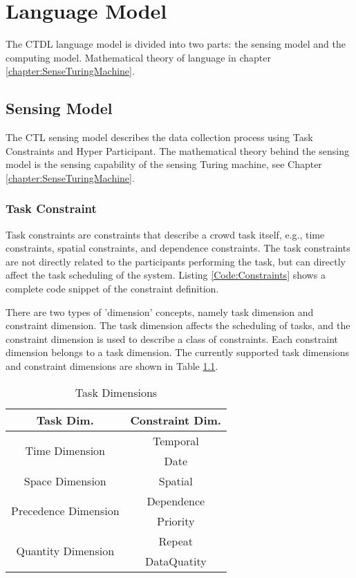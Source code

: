 \chapter{Language Model}
The CTDL language model is divided into two parts: the sensing model and the computing model. Mathematical theory of language in chapter \ref{chapter:SenseTuringMachine}.
\section{Sensing Model}
The CTL sensing model describes the data collection process using Task Constraints and Hyper Participant. The mathematical theory behind the sensing model is the sensing capability of the sensing Turing machine, see Chapter \ref{chapter:SenseTuringMachine}.

\subsection{Task Constraint}
Task constraints are constraints that describe a crowd task itself, e.g., time constraints, spatial constraints, and dependence constraints. The task constraints are not directly related to the participants performing the task, but can directly affect the task scheduling of the system. Listing \ref{Code:Constraints} shows a complete code snippet of the constraint definition.



There are two types of 'dimension' concepts, namely task dimension and constraint dimension. The task dimension affects the scheduling of tasks, and the constraint dimension is used to describe a class of constraints. Each constraint dimension belongs to a task dimension. The currently supported task dimensions and constraint dimensions are shown in Table \ref{tab:TaskDimensions}. 

\begin{table}[htbp]
\centering
\begin{tabular}{cc}
    \toprule
    Task Dim. & Constraint Dim. \\
    \midrule
    \multirow{2}{*}{Time Dimension}& Temporal  \\
    & Date \\
    Space Dimension & Spatial  \\
    \multirow{2}{*}{Precedence Dimension}& Dependence \\
    & Priority  \\
    \multirow{2}{*}{Quantity Dimension}& Repeat \\
    & DataQuatity \\
    \bottomrule
\end{tabular}
\caption{Task Dimensions}
\label{tab:TaskDimensions}
\end{table}

